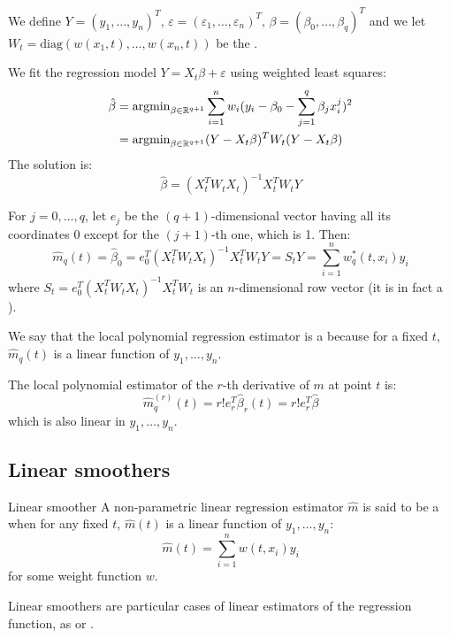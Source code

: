 We define $Y = (y_1, \ldots, y_n)^T,\, \varepsilon = (\varepsilon_1, \ldots, \varepsilon_n)^T,\,
	\beta = (\beta_0, \ldots, \beta_q)^T$ and we let $W_t = \text{diag}(w(x_1, t), \ldots, w(x_n,t))$
be the .

We fit the regression model $Y = X_t\beta + \varepsilon$ using weighted least squares:
\begin{align*}
	\hat\beta & = \operatorname{argmin}_{\beta\in\mathbb{R}^{q+1}} \sum_{i=1}^n w_i(y_i - \beta_0 - \sum_{j=1}^q \beta_j x_i^j)^2 \\
	          & = \operatorname{argmin}_{\beta\in\mathbb{R}^{q+1}} (Y - X_t\beta)^T W_t (Y - X_t\beta)
\end{align*}
The solution is:
\begin{equation*}
	\hat\beta = (X_t^T W_t X_t)^{-1} X_t^T W_t Y
\end{equation*}

For $j=0,\ldots,q$, let $e_j$ be the $(q+1)$-dimensional vector
having all its coordinates 0 except for the $(j+1)$-th one, which is 1.
Then:
\begin{equation*}
	\hat m_q(t) = \hat \beta_0 = e_0^T (X_t^T W_t X_t)^{-1} X_t^T W_t Y = S_tY = \sum_{i=1}^n w^*_q(t, x_i) y_i
\end{equation*}
where $S_t = e_0^T (X_t^T W_t X_t)^{-1} X_t^T W_t$ is an $n$-dimensional row vector (it
is in fact a ).

\begin{note}
	We say that the local polynomial regression estimator is a 
	because for a fixed $t$, $\hat m_q(t)$ is a linear function of $y_1,\ldots,y_n$.
\end{note}

The local polynomial estimator of the $r$-th derivative of $m$ at point $t$ is:
\begin{equation*}
	\hat m_q^{(r)}(t) = r!e_r^T\hat\beta_r(t) = r!e_r^T\hat\beta
\end{equation*}
which is also linear in $y_1,\ldots,y_n$.

\subsection{Linear smoothers}

\begin{definition}{Linear smoother}{}
	A non-parametric linear regression estimator $\hat m$ is said to be
	a  when for any fixed $t$, $\hat m(t)$ is a linear function of
	$y_1,\ldots,y_n$:
	\begin{equation*}
		\hat m(t) = \sum_{i=1}^n w(t, x_i) y_i
	\end{equation*}
	for some weight function $w$.
	\tcblower
	\begin{note}
		Linear smoothers are particular cases of linear estimators of the regression
		function, as  or .
	\end{note}
\end{definition}


